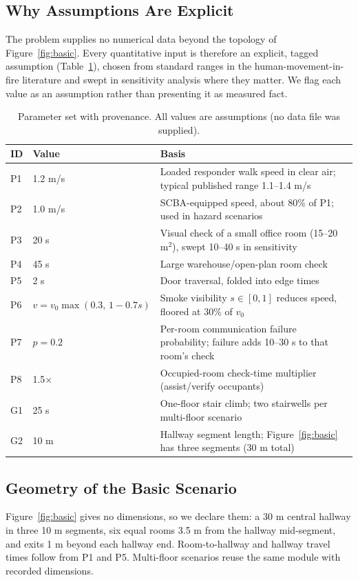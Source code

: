 \documentclass{mcmthesis}
\begin{document}
\subsection{Why Assumptions Are Explicit}
The problem supplies no numerical data beyond the topology of Figure~\ref{fig:basic}. Every quantitative input is therefore an explicit, tagged assumption (Table~\ref{tab:params}), chosen from standard ranges in the human-movement-in-fire literature and swept in sensitivity analysis where they matter. We flag each value as an assumption rather than presenting it as measured fact.

\begin{table}[H]
\centering
\small
\caption{Parameter set with provenance. All values are assumptions (no data file was supplied).}
\label{tab:params}
\begin{tabularx}{\textwidth}{llX}
\toprule
ID & Value & Basis \\ \midrule
P1 & 1.2 m/s & Loaded responder walk speed in clear air; typical published range 1.1--1.4 m/s \\
P2 & 1.0 m/s & SCBA-equipped speed, about 80\% of P1; used in hazard scenarios \\
P3 & 20 s & Visual check of a small office room (15--20 m$^2$), swept 10--40 s in sensitivity \\
P4 & 45 s & Large warehouse/open-plan room check \\
P5 & 2 s & Door traversal, folded into edge times \\
P6 & $v = v_0 \max(0.3,\,1-0.7s)$ & Smoke visibility $s \in [0,1]$ reduces speed, floored at 30\% of $v_0$ \\
P7 & $p=0.2$ & Per-room communication failure probability; failure adds 10--30 s to that room's check \\
P8 & 1.5$\times$ & Occupied-room check-time multiplier (assist/verify occupants) \\
G1 & 25 s & One-floor stair climb; two stairwells per multi-floor scenario \\
G2 & 10 m & Hallway segment length; Figure~\ref{fig:basic} has three segments (30 m total) \\
\bottomrule
\end{tabularx}
\end{table}

\subsection{Geometry of the Basic Scenario}
Figure~\ref{fig:basic} gives no dimensions, so we declare them: a 30 m central hallway in three 10 m segments, six equal rooms 3.5 m from the hallway mid-segment, and exits 1 m beyond each hallway end. Room-to-hallway and hallway travel times follow from P1 and P5. Multi-floor scenarios reuse the same module with recorded dimensions.
\end{document}
